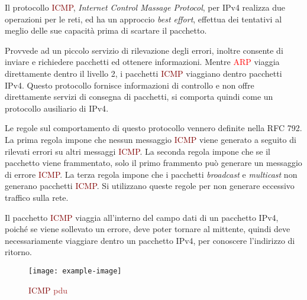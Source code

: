 \documentclass{article}
\numberwithin{equation}{subsection}
\begin{document}
Il protocollo \textcolor{Maroon}{ICMP}, \textit{Internet Control Massage Protocol}, per \textcolor{BurntOrange}{IPv4} realizza due operazioni per le reti, ed ha un approccio \textit{best effort}, effettua dei tentativi al meglio delle sue capacità prima di scartare il pacchetto. 

Provvede ad un piccolo servizio di rilevazione degli errori, inoltre consente di inviare e richiedere pacchetti ed ottenere informazioni. 
Mentre \textcolor{Red}{ARP} viaggia direttamente dentro il livello 2, i pacchetti \textcolor{Maroon}{ICMP} viaggiano dentro pacchetti \textcolor{BurntOrange}{IPv4}. Questo protocollo fornisce informazioni di controllo e non offre direttamente servizi di consegna di pacchetti, si comporta quindi come un protocollo ausiliario di \textcolor{BurntOrange}{IPv4}. 

Le regole sul comportamento di questo protocollo vennero definite nella RFC 792. La prima regola impone che nessun messaggio \textcolor{Maroon}{ICMP} viene generato a seguito di 
rilevati errori su altri messaggi \textcolor{Maroon}{ICMP}. La seconda regola impone che se il pacchetto viene frammentato, solo il primo frammento può generare un messaggio di errore \textcolor{Maroon}{ICMP}. 
La terza regola impone che i pacchetti \textit{broadcast} e \textit{multicast} non generano pacchetti \textcolor{Maroon}{ICMP}. 
Si utilizzano queste regole per non generare eccessivo traffico sulla rete. 

Il pacchetto \textcolor{Maroon}{ICMP} viaggia all'interno del campo dati di un pacchetto \textcolor{BurntOrange}{IPv4}, poiché se viene sollevato un errore, deve poter tornare al mittente, quindi deve 
necessariamente viaggiare dentro un pacchetto \textcolor{BurntOrange}{IPv4}, per conoscere l'indirizzo di ritorno. 

\begin{figure}[H]%
    \centering%
    \texttt{[image: example-image]}%
    \caption{\textcolor{Maroon}{ICMP} \textcolor{Brown}{pdu}}%
\end{figure}
\end{document}
